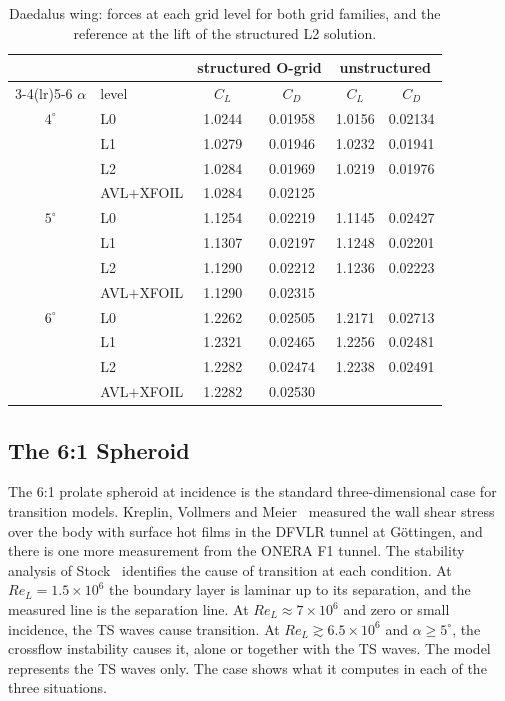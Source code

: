 \documentclass[conf]{new-aiaa}
\begin{document}
\begin{table}[!htbp]
  \centering\small
  \caption{Daedalus wing: forces at each grid level for both grid families, and the reference at the lift of the structured L2 solution.}
  \label{t:daetotals}
  \begin{tabular}{cl cc cc}
    \toprule
    & & \multicolumn{2}{c}{structured O-grid} & \multicolumn{2}{c}{unstructured}\\
    \cmidrule(lr){3-4}\cmidrule(lr){5-6}
    $\alpha$ & level & $C_L$ & $C_D$ & $C_L$ & $C_D$\\
    \midrule
    $4^\circ$ & L0 & 1.0244 & 0.01958 & 1.0156 & 0.02134\\
              & L1 & 1.0279 & 0.01946 & 1.0232 & 0.01941\\
              & L2 & 1.0284 & 0.01969 & 1.0219 & 0.01976\\
              & AVL$+$XFOIL & 1.0284 & 0.02125 & &\\
    \midrule
    $5^\circ$ & L0 & 1.1254 & 0.02219 & 1.1145 & 0.02427\\
              & L1 & 1.1307 & 0.02197 & 1.1248 & 0.02201\\
              & L2 & 1.1290 & 0.02212 & 1.1236 & 0.02223\\
              & AVL$+$XFOIL & 1.1290 & 0.02315 & &\\
    \midrule
    $6^\circ$ & L0 & 1.2262 & 0.02505 & 1.2171 & 0.02713\\
              & L1 & 1.2321 & 0.02465 & 1.2256 & 0.02481\\
              & L2 & 1.2282 & 0.02474 & 1.2238 & 0.02491\\
              & AVL$+$XFOIL & 1.2282 & 0.02530 & &\\
    \bottomrule
  \end{tabular}
\end{table}

\FloatBarrier
\subsection{The 6:1 Spheroid}

The 6:1 prolate spheroid at incidence is the standard three-dimensional case
for transition models. Kreplin, Vollmers and Meier~\cite{kreplin_1985}
measured the wall shear stress over the body with surface hot films in the
DFVLR tunnel at G\"ottingen, and there is one more measurement from the ONERA
F1 tunnel. The stability analysis of Stock~\cite{stock_2006} identifies the
cause of transition at each condition. At $Re_L=1.5\times10^6$ the boundary
layer is laminar up to its separation, and the measured line is the
separation line. At $Re_L\approx7\times10^6$ and zero or small incidence, the
TS waves cause transition. At $Re_L\gtrsim6.5\times10^6$ and
$\alpha\ge5^\circ$, the crossflow instability causes it, alone or together
with the TS waves. The model represents the TS waves only. The case shows
what it computes in each of the three situations.
\end{document}
